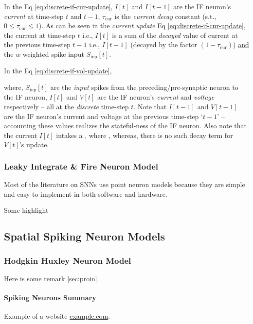 
In the Eq \eqref{eq:discrete-if-cur-update}, $I[t]$ and $I[t-1]$ are the IF neuron's \textit{current} at time-step $t$ and $t-1$, $\tau_\text{cur}$ is the \textit{current decay} constant (s.t., $0\leq\tau_\text{cur}\leq1$). As can be seen in the \textit{current update} Eq \eqref{eq:discrete-if-cur-update}, the current at time-step $t$ i.e., $I[t]$ is a sum of the \textit{decayed} value of current at the previous time-step $t-1$ i.e., $I[t-1]$ (decayed by the factor $(1 - \tau_\text{cur})$) \ul{and} the $w$ weighted spike input $S_\text{inp}[t]$.

In the Eq \eqref{eq:discrete-if-vol-update}, 


where, $S_\text{inp}[t]$ are the \textit{input} spikes from the preceding/pre-synaptic neuron to the IF neuron, $I[t]$ and $V[t]$ are the IF neuron's \textit{current} and \textit{voltage} respectively -- all at the \textit{discrete} time-step $t$. Note that $I[t-1]$ and $V[t-1]$ are the IF neuron's current and voltage at the previous time-step `$t-1$' -- accounting these values realizes the stateful-ness of the IF neuron. Also note that the current $I[t]$ intakes a , where , whereas, there is no such decay term for $V[t]$'s update.

\subsubsection{Leaky Integrate \& Fire Neuron Model}
\begin{remark}
    Most of the literature on SNNs use point neuron models because they are simple and easy to implement in both software and hardware.
\end{remark}

\begin{highlight}
Some highlight
\end{highlight}
\subsection{Spatial Spiking Neuron Models}
\subsubsection{Hodgkin Huxley Neuron Model}

\begin{remark}
Here is some remark \ref{sec:proin}.
\end{remark}

\newpage %
\paragraph{Spiking Neurons Summary}
Example of a website \href{https://example.com/}{example.com}.